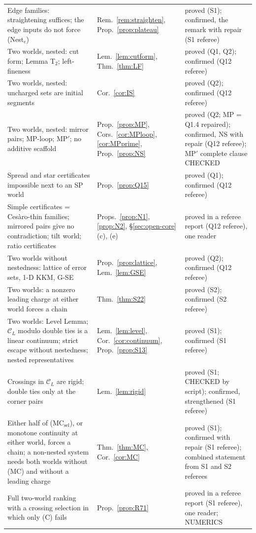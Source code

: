 \documentclass[11pt]{article}
\theoremstyle{definition}
\theoremstyle{remark}
\newcommand{\C}{\mathcal C}
\begin{document}
{\begin{longtable}{>{\raggedright\arraybackslash}p{6.4cm}>{\raggedright\arraybackslash}p{2.1cm}>{\raggedright\arraybackslash}p{5.6cm}}
Edge families: straightening suffices; the edge inputs do not force (Nest$_e$) & Rem.~\ref{rem:straighten}, Prop.~\ref{prop:plateau} & proved (S1); confirmed, the remark with repair (S1 referee)\\
Two worlds, nested: cut form; Lemma T$_2$; left-fineness & Lem.~\ref{lem:cutform}, Thm.~\ref{thm:LF} & proved (Q1, Q2); confirmed (Q12 referee)\\
Two worlds, nested: uncharged sets are initial segments & Cor.~\ref{cor:IS} & proved (Q2); confirmed (Q12 referee)\\
Two worlds, nested: mirror pairs; MP-loop; MP$'$; no additive scaffold & Prop.~\ref{prop:MP}, Cors.~\ref{cor:MPloop}, \ref{cor:MPprime}, Prop.~\ref{prop:NS} & proved (Q2; MP = Q1.4 repaired); confirmed, NS with repair (Q12 referee); MP$'$ complete clause CHECKED\\
Spread and star certificates impossible next to an SP world & Prop.~\ref{prop:Q15} & proved (Q1); confirmed (Q12 referee)\\
Simple certificates = Ces\`aro-thin families; mirrored pairs give no contradiction; tilt world; ratio certificates & Props.~\ref{prop:N1}, \ref{prop:N2}, \S\ref{sec:open-core}(c), (e) & proved in a referee report (Q12 referee), one reader\\
Two worlds without nestedness: lattice of error sets, 1-D KKM, G-SE & Prop.~\ref{prop:lattice}, Lem.~\ref{lem:GSE} & proved (Q2); confirmed (Q12 referee)\\
Two worlds: a nonzero leading charge at either world forces a chain & Thm.~\ref{thm:S22} & proved (S2); confirmed (S2 referee)\\
Two worlds: Level Lemma; $\C_L$ modulo double ties is a linear continuum; strict escape without nestedness; nested representatives & Lem.~\ref{lem:level}, Cor.~\ref{cor:continuum}, Prop.~\ref{prop:S13} & proved (S1); confirmed (S1 referee)\\
Crossings in $\C_L$ are rigid; double ties only at the corner pairs & Lem.~\ref{lem:rigid} & proved (S1; CHECKED by script); confirmed, strengthened (S1 referee)\\
Either half of (MC$_{\mathrm{sel}}$), or monotone continuity at either world, forces a chain; a non-nested system needs both worlds without (MC) and without a leading charge & Thm.~\ref{thm:MC}, Cor.~\ref{cor:MC} & proved (S1); confirmed with repair (S1 referee); combined statement from S1 and S2 referees\\
Full two-world ranking with a crossing selection in which only (C) fails & Prop.~\ref{prop:R71} & proved in a referee report (S1 referee), one reader; NUMERICS\\

\end{longtable}}
\end{document}
